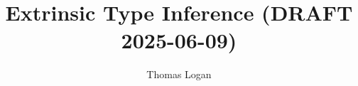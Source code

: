 \documentclass[table,dvipsnames,acmsmall]{acmart}
\title{Extrinsic Type Inference (DRAFT 2025-06-09)}
\author{Thomas Logan}
\newcounter{pdc}
\newcounter{sdc}
\theoremstyle{definition}
\begin{document}
\newcommand{\stoprule}{
  \addlinespace[2pt]
  \toprule
  \addlinespace[5pt]
}

\newcommand{\sbottomrule}{
  \addlinespace[2pt]
  \bottomrule
  \addlinespace[2pt]
}

\newcommand{\smidrule}[1]{
  \addlinespace[2pt]
  \midrule
  \addlinespace[2pt]
}

\newcommand{\scmidrule}[1]{
  \addlinespace[2pt]
  \cmidrule{#1}
  \addlinespace[2pt]
}


\newcommand{\sline}{
  \arrayrulecolor{gray!50}
  \specialrule{0.4pt}{2pt}{2pt}
  \arrayrulecolor{black}
}

\newcommand{\pdc}{\stepcounter{pdc}\arabic{pdc}}
\newcommand{\sdc}{\stepcounter{sdc}\arabic{sdc}}

\newcommand{\Par}[1]{\paragraph{\textbf{#1}}}
\newcommand{\J}[1]{\texttt{\fontfamily{pcr}\selectfont #1}}
\newcommand{\lab}[1]{\text{\color{Gray}\ [#1]}}
\newcommand{\entails}{\vdash}
\newcommand{\satisfies}{\vDash}
\newcommand{\given}{\dashv}
\newcommand{\with}{\ \diamond\ }
\newcommand{\notfree}{\ \#\ }
\newcommand{\consis}{\ \star}
\newcommand{\safe}{\ \checkmark}
\newcommand{\relational}{\ \Re}


\newcommand{\pass}{\text{\scriptsize \color{Green} \ding{51}}}
\newcommand{\assisted}{\text{\scriptsize \color{Purple} \ding{45}}}
\newcommand{\fail}{\text{\scriptsize \color{red} \ding{55}}}

\newcommand{\unique}{\ \dagger}

\newcommand{\factorsinto}{\Vdash}


\newcommand{\allsafe}{\ \Re\checkmark}

\newcommand{\qua}{\ .\ }



\newcommand{\ignore}{\varnothing}
\newcommand{\dTheta}{\dot{\Theta}}
\newcommand{\closed}{\bullet}
\newcommand{\local}{\blacktriangle}
\newcommand{\open}{\circ}



\newcommand{\up}{\ \land\ }
\newcommand{\down}{\ \lor\ }


\newcommand{\multi}[1]{\widebar{\ #1\ }}
\newcommand{\hastype}{:}
\newcommand{\pattype}{\ \lozenge\ }
\newcommand{\liftfun}{:}
\end{document}
